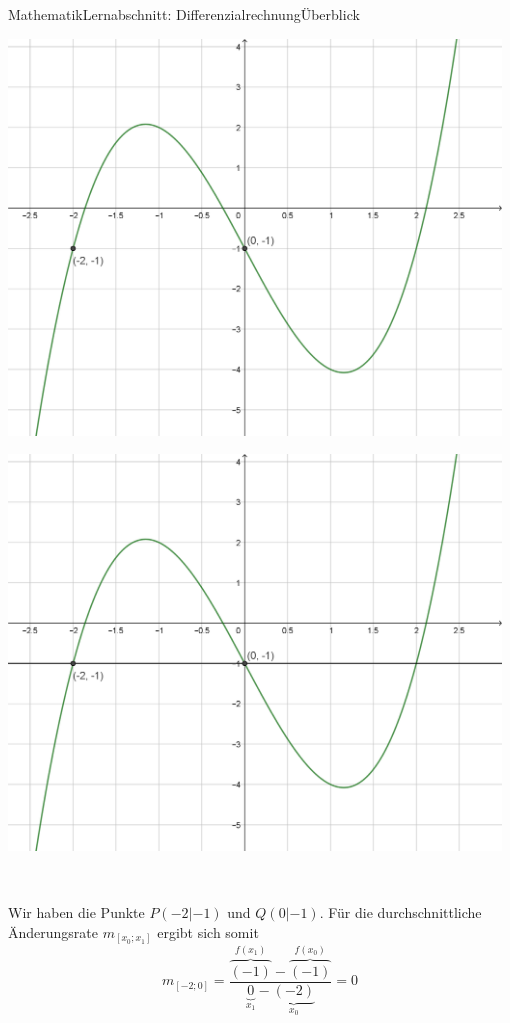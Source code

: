 \documentclass[11pt,twocolumn,oneside,openany,headings=optiontotoc,11pt,numbers=noenddot,final]{article}
\begin{document}
\begin{worksheet}{Mathematik}{Lernabschnitt: Differenzialrechnung}{Überblick}
\begin{minipage}{0.2\textwidth}
			\includegraphics[width=0.98\textwidth,align=t]{../99_Bilder/04_Skr_DifQuo.png}
		\end{minipage}
		\hfill
		\begin{minipage}{0.2\textwidth}
			\includegraphics[width=0.98\textwidth,align=t]{../99_Bilder/04_Skr_DifQuo_G.png}
		\end{minipage}\\
		\par\noindent
		Wir haben die Punkte \(P(-2|-1)\) und \(Q(0|-1)\). Für die durchschnittliche Änderungsrate \(m_{[x_0;x_1]}\) ergibt sich somit
		\[m_{[-2;0]} = \frac{\overbrace{(-1)}^{f(x_1)} - \overbrace{(-1)}^{f(x_0)}}{\underbrace{0}_{x_1} - \underbrace{(-2)}_{x_0}} = 0\]

\end{worksheet}
\end{document}
